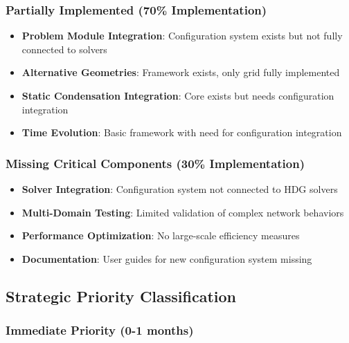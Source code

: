 \subsubsection{Partially Implemented (70\% Implementation)}
\begin{itemize}
    \item \textbf{Problem Module Integration}: Configuration system exists but not fully connected to solvers
    \item \textbf{Alternative Geometries}: Framework exists, only grid fully implemented
    \item \textbf{Static Condensation Integration}: Core exists but needs configuration integration
    \item \textbf{Time Evolution}: Basic framework with need for configuration integration
\end{itemize}

\subsubsection{Missing Critical Components (30\% Implementation)}
\begin{itemize}
    \item \textbf{Solver Integration}: Configuration system not connected to HDG solvers
    \item \textbf{Multi-Domain Testing}: Limited validation of complex network behaviors
    \item \textbf{Performance Optimization}: No large-scale efficiency measures
    \item \textbf{Documentation}: User guides for new configuration system missing
\end{itemize}

\subsection{Strategic Priority Classification}

\subsubsection{Immediate Priority (0-1 months)}

